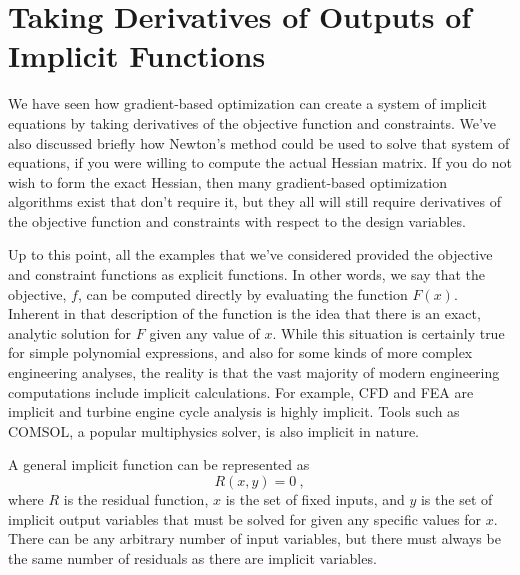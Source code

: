 \documentclass[conf]{new-aiaa}
\begin{document}
    \section{Taking Derivatives of Outputs of Implicit Functions}
    \label{sec:taking_derivs_of_implicit_functions}

    We have seen how gradient-based optimization can create a system of implicit equations by taking derivatives of the objective function and constraints. We've also discussed briefly how Newton's method could be used to solve that system of equations, if you were willing to compute the actual Hessian matrix.
    If you do not wish to form the exact Hessian, then many gradient-based optimization algorithms exist that don't require it, 
    but they all will still require derivatives of the objective function and constraints with respect to the design variables. 

    Up to this point, all the examples that we've considered provided the objective and constraint functions as explicit functions. 
    In other words, we say that the objective, $f$, can be computed directly by evaluating the function $F(x)$. 
    Inherent in that description of the function is the idea that there is an exact, analytic solution for $F$ given any value of $x$. 
    While this situation is certainly true for simple polynomial expressions, and also for some kinds of more complex engineering analyses, 
    the reality is that the vast majority of modern engineering computations include implicit calculations. 
    For example, CFD and FEA are implicit and turbine engine cycle analysis is highly implicit. 
    Tools such as COMSOL, a popular multiphysics solver, is also implicit in nature. 

    A general implicit function can be represented as 
    \begin{equation}
        R(x,y) = 0 \ , 
    \end{equation}
    where $R$ is the residual function, $x$ is the set of fixed inputs, and $y$ is the set of implicit output variables that must be solved for given any specific values for $x$. 
    There can be any arbitrary number of input variables, but there must always be the same number of residuals as there are implicit variables. 
\end{document}
